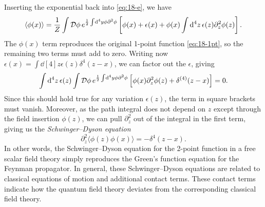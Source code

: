 Inserting the exponential back into \eqref{eq:18-e}, we have
\begin{equation}
  \label{eq:18-2}
  \langle \phi(x) \rangle = \frac{1}{Z} \int \mathop{\mathcal{D} \phi} e^{\frac{1}{2} \int \dd[4]{y} \phi \partial^2 \phi} \left[ \phi(x) + \epsilon(x) + \phi(x) \int \dd[4]{z} \epsilon(z) \partial^2_z \phi(z) \right].
\end{equation}
The $\phi(x)$ term reproduces the original 1-point function \eqref{eq:18-1pt}, so the remaining two terms must add to zero.
Writing now $\epsilon(x) = \int	\dd[4]{z} \epsilon(z) \delta^{4} (z - x)$, we can factor out the $\epsilon$, giving 
\begin{equation}
  \label{eq:18-3}
  \int \dd[4]{z} \epsilon(z) \int \mathop{\mathcal{D} \phi} e^{\frac{1}{2} \int \dd[4]{y} \phi \partial^2 \phi} \left[ \phi(x) \partial^2_z \phi(z) + \delta^{(4)}(z - x) \right] = 0.
\end{equation}
Since this should hold true for any variation $\epsilon(z)$, the term in square brackets must vanish.
Moreover, as the path integral does not depend on $z$ except through the field insertion $\phi(z)$, we can pull $\partial^2_z$ out of the integral in the first term, giving us the \emph{Schwinger--Dyson equation}
\begin{equation}
  \partial_z^2 \langle \phi(z) \phi(x) \rangle = -\delta^{4} (z - x).
\end{equation}
In other words, the Schwinger--Dyson equation for the 2-point function in a free scalar field theory simply reproduces the Green's function equation for the Feynman propagator.  In general, these Schwinger--Dyson equations are related to classical equations of motion and additional contact terms.  These contact terms indicate how the quantum field theory deviates from the corresponding classical field theory.
